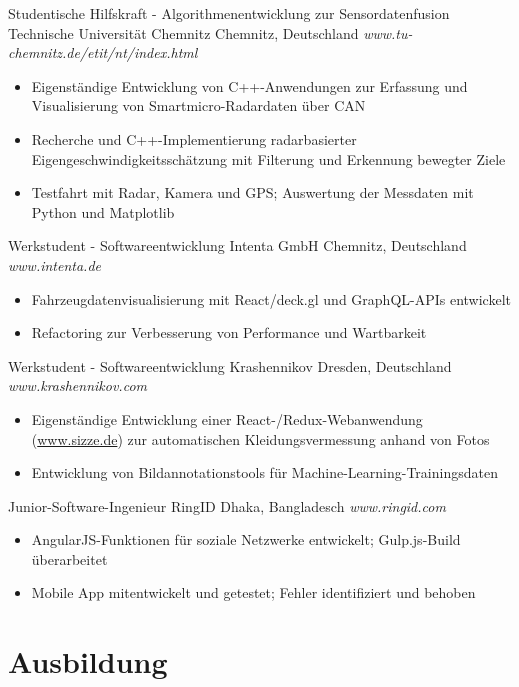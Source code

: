 \documentclass[11pt,a4paper,sans]{moderncv} %
\begin{document}
{Studentische Hilfskraft - Algorithmenentwicklung zur Sensordatenfusion}
{Technische Universität Chemnitz}
{Chemnitz, Deutschland}
{\textit{www.tu-chemnitz.de/etit/nt/index.html}}
{
\begin{itemize}
    \item Eigenständige Entwicklung von C++-Anwendungen zur Erfassung und Visualisierung von Smartmicro-Radardaten über CAN
    \item Recherche und C++-Implementierung radarbasierter Eigengeschwindigkeitsschätzung mit Filterung und Erkennung bewegter Ziele
    \item Testfahrt mit Radar, Kamera und GPS; Auswertung der Messdaten mit Python und Matplotlib
\end{itemize}
} 

{Werkstudent - Softwareentwicklung}
{Intenta GmbH}
{Chemnitz, Deutschland}
{\textit{www.intenta.de}}
{\begin{itemize}
    \item Fahrzeugdatenvisualisierung mit React/deck.gl und GraphQL-APIs entwickelt
    \item Refactoring zur Verbesserung von Performance und Wartbarkeit
\end{itemize}} 

{Werkstudent - Softwareentwicklung}
{Krashennikov}
{Dresden, Deutschland}
{\textit{www.krashennikov.com}}
{\begin{itemize}
    \item Eigenständige Entwicklung einer React-/Redux-Webanwendung (\underline{www.sizze.de}) zur automatischen Kleidungsvermessung anhand von Fotos
    \item Entwicklung von Bildannotationstools für Machine-Learning-Trainingsdaten
\end{itemize}} 

{Junior-Software-Ingenieur}
{RingID}
{Dhaka, Bangladesch}
{\textit{www.ringid.com}}
{\begin{itemize}
    \item AngularJS-Funktionen für soziale Netzwerke entwickelt; Gulp.js-Build überarbeitet
    \item Mobile App mitentwickelt und getestet; Fehler identifiziert und behoben
\end{itemize}} 


\section{Ausbildung}
\end{document}
